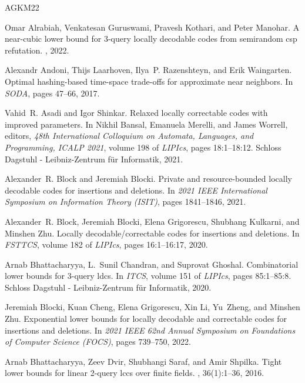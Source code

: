 \documentclass[10pt,a4paper]{article}
\theoremstyle{remark}
\begin{document}
\newcommand{\etalchar}[1]{$^{#1}$}
\begin{thebibliography}{AGKM22}

Omar Alrabiah, Venkatesan Guruswami, Pravesh Kothari, and Peter Manohar.
\newblock A near-cubic lower bound for 3-query locally decodable codes from
  semirandom csp refutation.
, 2022.

Alexandr Andoni, Thijs Laarhoven, Ilya~P. Razenshteyn, and Erik Waingarten.
\newblock Optimal hashing-based time-space trade-offs for approximate near
  neighbors.
\newblock In {\em {SODA}}, pages 47--66, 2017.

Vahid~R. Asadi and Igor Shinkar.
\newblock Relaxed locally correctable codes with improved parameters.
\newblock In Nikhil Bansal, Emanuela Merelli, and James Worrell, editors, {\em
  48th International Colloquium on Automata, Languages, and Programming,
  {ICALP} 2021}, volume 198 of {\em LIPIcs}, pages 18:1--18:12. Schloss
  Dagstuhl - Leibniz-Zentrum f{\"{u}}r Informatik, 2021.

Alexander~R. Block and Jeremiah Blocki.
\newblock Private and resource-bounded locally decodable codes for insertions
  and deletions.
\newblock In {\em 2021 IEEE International Symposium on Information Theory
  (ISIT)}, pages 1841--1846, 2021.

\bibitem[BBG{\etalchar{+}}20]{BlockBGKZ20}
Alexander~R. Block, Jeremiah Blocki, Elena Grigorescu, Shubhang Kulkarni, and
  Minshen Zhu.
\newblock Locally decodable/correctable codes for insertions and deletions.
\newblock In {\em {FSTTCS}}, volume 182 of {\em LIPIcs}, pages 16:1--16:17,
  2020.

Arnab Bhattacharyya, L.~Sunil Chandran, and Suprovat Ghoshal.
\newblock Combinatorial lower bounds for 3-query ldcs.
\newblock In {\em {ITCS}}, volume 151 of {\em LIPIcs}, pages 85:1--85:8.
  Schloss Dagstuhl - Leibniz-Zentrum f{\"{u}}r Informatik, 2020.

\bibitem[BCG{\etalchar{+}}22]{blocki2021exponential}
Jeremiah Blocki, Kuan Cheng, Elena Grigorescu, Xin Li, Yu~Zheng, and Minshen
  Zhu.
\newblock Exponential lower bounds for locally decodable and correctable codes
  for insertions and deletions.
\newblock In {\em 2021 IEEE 62nd Annual Symposium on Foundations of Computer
  Science (FOCS)}, pages 739--750, 2022.

Arnab Bhattacharyya, Zeev Dvir, Shubhangi Saraf, and Amir Shpilka.
\newblock Tight lower bounds for linear 2-query lccs over finite fields.
, 36(1):1--36, 2016.


\end{thebibliography}
\end{document}
